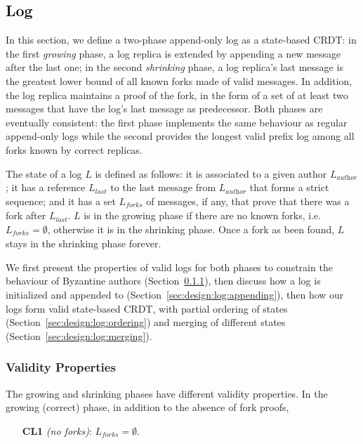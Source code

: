 \documentclass[9pt, oneside]{article}   	%
\begin{document}
\subsection{Log}
\label{sec:design:log}

In this section, we define a two-phase append-only log as a state-based CRDT: in the first \textit{growing} phase, a log replica is extended by appending a new message after the last one; in the second \textit{shrinking} phase, a log replica's last message is the greatest lower bound of all known forks made of valid messages. In addition, the log replica maintains a proof of the fork, in the form of a set of at least two messages that have the log's last message as predecessor. Both phases are eventually consistent: the first phase implements the same behaviour as regular append-only logs while the second  provides the longest valid prefix log among all forks known by correct replicas.

The state of a log $L$ is defined as follows: it is associated to a given author $L_\textit{author}$; it has a reference $L_\textit{last}$ to the last message from $L_\textit{author}$ that forms a strict sequence; and it has a set $L_\textit{forks}$ of messages, if any, that prove that there was a fork after $L_\textit{last}$. $L$ is in the growing phase if there are no known forks, i.e. $L_\textit{forks} = \emptyset$, otherwise it is in the shrinking phase. Once a fork as been found, $L$ stays in the shrinking phase forever. 

We first present the properties of valid logs for both phases to constrain the behaviour of Byzantine authors (Section~\ref{sec:design:log:validity}), then discuss how a log is initialized and appended to (Section~\ref{sec:design:log:appending}), then how our logs form valid state-based CRDT, with partial ordering of states (Section~\ref{sec:design:log:ordering}) and merging of different states (Section~\ref{sec:design:log:merging}). 

\subsubsection{Validity Properties}
\label{sec:design:log:validity}

The growing and shrinking phases have different validity properties. In the growing (correct) phase, in addition to the absence of fork proofs,
\begin{tcolorbox}
\begin{enumerate}
	\item[\textbf{CL1}] \textit{(no forks)}: $L_\textit{forks} = \emptyset$.
\end{enumerate}
\end{tcolorbox}
\end{document}

